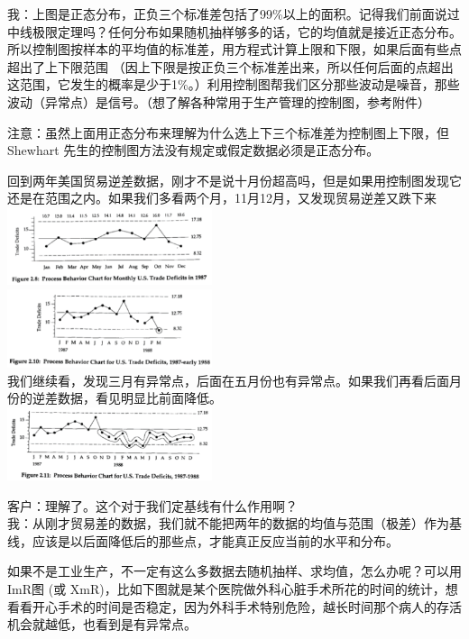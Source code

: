 我：上图是正态分布，正负三个标准差包括了99\%以上的面积。记得我们前面说过中线极限定理吗？任何分布如果随机抽样够多的话，它的均值就是接近正态分布。所以控制图按样本的平均值的标准差，用方程式计算上限和下限，如果后面有些点超出了上下限范围
（因上下限是按正负三个标准差出来，所以任何后面的点超出这范围，它发生的概率是少于1\%。）利用控制图帮我们区分那些波动是噪音，那些波动（异常点）是信号。（想了解各种常用于生产管理的控制图，参考附件）

注意：虽然上面用正态分布来理解为什么选上下三个标准差为控制图上下限，但Shewhart
先生的控制图方法没有规定或假定数据必须是正态分布。

回到两年美国贸易逆差数据，刚才不是说十月份超高吗，但是如果用控制图发现它还是在范围之内。如果我们多看两个月，11月12月，又发现贸易逆差又跌下来\\
\includegraphics[width=6cm]{The_key_fig281.png}\\
\includegraphics[width=6cm]{The_key_fig2101.png}\\
我们继续看，发现三月有异常点，后面在五月份也有异常点。如果我们再看后面月份的逆差数据，看见明显比前面降低。\\
\includegraphics[width=6cm]{The_key_fig2111.png}

客户：理解了。这个对于我们定基线有什么作用啊？\\
我：从刚才贸易差的数据，我们就不能把两年的数据的均值与范围（极差）作为基线，应该是以后面降低后的那些点，才能真正反应当前的水平和分布。

如果不是工业生产，不一定有这么多数据去随机抽样、求均值，怎么办呢？可以用ImR图
(或
XmR)，比如下图就是某个医院做外科心脏手术所花的时间的统计，想看看开心手术的时间是否稳定，因为外科手术特别危险，越长时间那个病人的存活机会就越低，也看到是有异常点。

